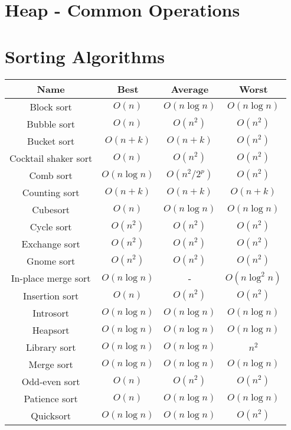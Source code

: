 \documentclass{article}
\begin{document}
\newpage
\section*{Heap - Common Operations}


\newpage
\section*{Sorting Algorithms}

\begin{table}[ht]
	\centering
	\scriptsize
	\begin{tabular}{cccc}
		Name & Best& Average & Worst\\
		\hline
		Block sort & $O(n)$ & $O(n\log{n})$ & $O(n\log{n})$ \\
		Bubble sort & $O(n)$ & $O(n^2)$ & $O(n^2)$ \\
		Bucket sort\footnotemark[10] & $O(n+k)$ & $O(n+k)$ & $O(n^2)$ \\
		Cocktail shaker sort & $O(n)$ & $O(n^2)$ & $O(n^2)$ \\
		Comb sort\footnotemark[11] & $O(n\log{n})$ & $O(n^2/2^p)$ & $O(n^2)$ \\
		Counting sort\footnotemark[12] & $O(n+k)$ & $O(n+k)$ & $O(n+k)$ \\
		Cubesort & $O(n)$ & $O(n\log{n})$ & $O(n\log{n})$ \\
		Cycle sort & $O(n^2)$ & $O(n^2)$ & $O(n^2)$ \\
		Exchange sort & $O(n^2)$ & $O(n^2)$ & $O(n^2)$ \\
		Gnome sort & $O(n^2)$ & $O(n^2)$ & $O(n^2)$ \\
		In-place merge sort & $O(n\log{n})$ & - & $O(n\log^2{n})$ \\
		Insertion sort &$O(n)$ & $O(n^2)$ & $O(n^2)$ \\
		Introsort & $O(n\log{n})$ & $O(n\log{n})$ & $O(n\log{n})$ \\
		Heapsort & $O(n\log{n})$ & $O(n\log{n})$ & $O(n\log{n})$ \\
		Library sort & $O(n\log{n})$ & $O(n\log{n})$ & $n^2$ \\
		Merge sort & $O(n\log{n})$ & $O(n\log{n})$ & $O(n\log{n})$ \\
		Odd-even sort & $O(n)$ & $O(n^2)$ & $O(n^2)$ \\
		Patience sort & $O(n)$ & $O(n\log{n})$ & $O(n\log{n})$ \\
		Quicksort & $O(n\log{n})$ & $O(n\log{n})$ & $O(n^2)$ \\

\end{tabular}
\end{table}
\end{document}

